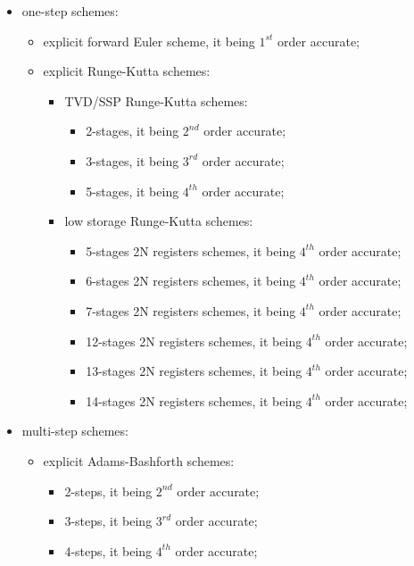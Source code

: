 \begin{itemize}
  \item one-step schemes:
    \begin{itemize}
      \item explicit forward Euler scheme, it being $1^{st}$ order accurate;
      \item explicit Runge-Kutta schemes:
        \begin{itemize}
          \item TVD/SSP Runge-Kutta schemes:
            \begin{itemize}
              \item 2-stages, it being $2^{nd}$ order accurate;
              \item 3-stages, it being $3^{rd}$ order accurate;
              \item 5-stages, it being $4^{th}$ order accurate;
              \end{itemize}
          \item low storage Runge-Kutta schemes:
            \begin{itemize}
              \item 5-stages 2N registers schemes, it being $4^{th}$ order accurate;
              \item 6-stages 2N registers schemes, it being $4^{th}$ order accurate;
              \item 7-stages 2N registers schemes, it being $4^{th}$ order accurate;
              \item 12-stages 2N registers schemes, it being $4^{th}$ order accurate;
              \item 13-stages 2N registers schemes, it being $4^{th}$ order accurate;
              \item 14-stages 2N registers schemes, it being $4^{th}$ order accurate;
              \end{itemize}
          \end{itemize}
      \end{itemize}
  \item multi-step schemes:
    \begin{itemize}
      \item explicit Adams-Bashforth schemes:
        \begin{itemize}
          \item 2-steps, it being $2^{nd}$ order accurate;
          \item 3-steps, it being $3^{rd}$ order accurate;
          \item 4-steps, it being $4^{th}$ order accurate;

\end{itemize}
\end{itemize}
\end{itemize}

